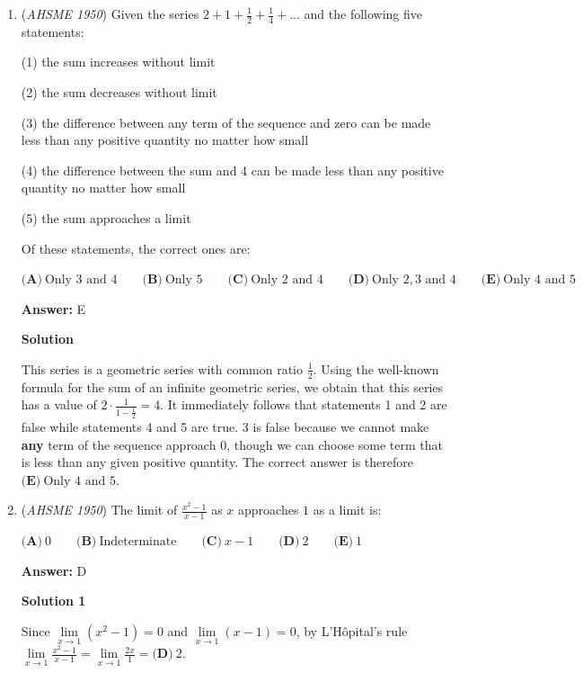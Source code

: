 \begin{enumerate}
 


	\item (\textit{AHSME 1950}) Given the series $2+1+\frac{1}{2}+\frac{1}{4}+...$ and the following five statements:


 (1) the sum increases without limit


 (2) the sum decreases without limit


 (3) the difference between any term of the sequence and zero can be made less than any positive quantity no matter how small


 (4) the difference between the sum and 4 can be made less than any positive quantity no matter how small


 (5) the sum approaches a limit


 Of these statements, the correct ones are:


 $\textbf{(A)}\ \text{Only }3\text{ and }4\qquad\textbf{(B)}\ \text{Only }5\qquad\textbf{(C)}\ \text{Only }2\text{ and }4\qquad\textbf{(D)}\ \text{Only }2,3\text{ and }4\qquad\textbf{(E)}\ \text{Only }4\text{ and }5$

 \textbf{Answer: }E



\textbf{Solution}

This series is a geometric series with common ratio $\frac{1}{2}$. Using the well-known formula for the sum of an infinite geometric series, we obtain that this series has a value of $2\cdot \frac{1}{1-\frac{1}{2}}=4$. It immediately follows that statements 1 and 2 are false while statements 4 and 5 are true. 3 is false because we cannot make \textbf{any} term of the sequence approach 0, though we can choose some term that is less than any given positive quantity. The correct answer is therefore $\boxed{\textbf{(E)}\ \text{Only }4\text{ and }5}$.

 


	\item (\textit{AHSME 1950}) The limit of $\frac{x^{2}-1}{x-1}$ as $x$ approaches $1$ as a limit is:


 $\textbf{(A)}\ 0\qquad\textbf{(B)}\ \text{Indeterminate}\qquad\textbf{(C)}\ x-1\qquad\textbf{(D)}\ 2\qquad\textbf{(E)}\ 1$

 \textbf{Answer: }D



\textbf{Solution 1}

Since $\lim \limits_{x\to 1} (x^2-1) = 0$ and $\lim \limits_{x\to 1} (x-1) = 0$, by L'Hôpital's rule $\lim \limits_{x\to 1}\frac{x^2-1}{x-1} = \lim \limits_{x\to 1}\frac{2x}{1} = \boxed{\textbf{(D)}\ 2}$.


\end{enumerate}
